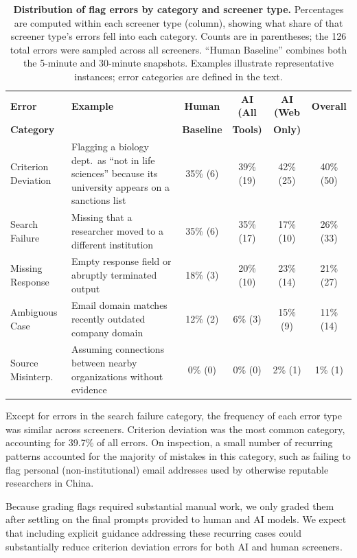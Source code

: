 \documentclass[utf8]{FrontiersinHarvard}
\begin{document}
\begin{table}[!t]
\centering
\caption{\textbf{Distribution of flag errors by category and screener type.} Percentages are computed within each screener type (column), showing what share of that screener type's errors fell into each category. Counts are in parentheses; the 126 total errors were sampled across all screeners. ``Human Baseline'' combines both the 5-minute and 30-minute snapshots. Examples illustrate representative instances; error categories are defined in the text.}
\label{tab:errors}
\small
\begin{tabular}{p{2.2cm}p{3.8cm}cccc}
\toprule
\textbf{Error} & \textbf{Example} & \textbf{Human} & \textbf{AI (All} & \textbf{AI (Web} & \textbf{Overall} \\
\textbf{Category} & & \textbf{Baseline} & \textbf{Tools)} & \textbf{Only)} & \\
\midrule
Criterion Deviation & Flagging a biology dept.\ as ``not in life sciences'' because its university appears on a sanctions list & 35\% (6) & 39\% (19) & 42\% (25) & 40\% (50) \\
\addlinespace
Search Failure & Missing that a researcher moved to a different institution & 35\% (6) & 35\% (17) & 17\% (10) & 26\% (33) \\
\addlinespace
Missing Response & Empty response field or abruptly terminated output & 18\% (3) & 20\% (10) & 23\% (14) & 21\% (27) \\
\addlinespace
Ambiguous Case & Email domain matches recently outdated company domain & 12\% (2) & 6\% (3) & 15\% (9) & 11\% (14) \\
\addlinespace
Source Misinterp. & Assuming connections between nearby organizations without evidence & 0\% (0) & 0\% (0) & 2\% (1) & 1\% (1) \\
\bottomrule
\end{tabular}
\end{table}

Except for errors in the search failure category, the frequency of each error type was similar across screeners. Criterion deviation was the most common category, accounting for 39.7\% of all errors. On inspection, a small number of recurring patterns accounted for the majority of mistakes in this category, such as failing to flag personal (non-institutional) email addresses used by otherwise reputable researchers in China.

Because grading flags required substantial manual work, we only graded them after settling on the final prompts provided to human and AI models. We expect that including explicit guidance addressing these recurring cases could substantially reduce criterion deviation errors for both AI and human screeners.
\end{document}

